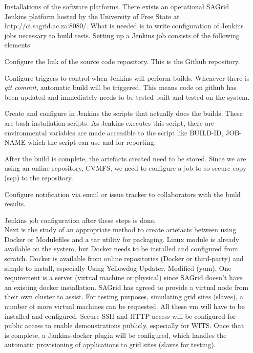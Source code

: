 \documentclass [titlepage,11pt]{article}
\begin{document}
Installations of the software platforms. There exists an operational SAGrid Jenkins platform hosted by the University of Free State at http://ci.sagrid.ac.za:8080/. What is needed is to write configuration of Jenkins jobs necessary to build tests. Setting up a Jenkins job  consists of the following elements \begin{enumerate*}[label=\itshape\alph*\upshape)]
\item Configure the link of the source code repository. This is the Github repository. 
\item Configure triggers to control when Jenkins will perform builds. Whenever there is \emph{git commit}, automatic build will be triggered. This means code on github has been updated and immediately needs to be tested built and tested on the system. 
\item Create and configure in Jenkins the scripts that actually does the builds. These are bash installation scripts. As Jenkins executes this script, there are environmental variables are made accessible to the script like BUILD-ID, JOB-NAME which the script can use and for reporting. 
\item After the build is complete, the artefacts created need to be stored. Since we are using an online repository, CVMFS, we need to configure a job to so secure copy (scp) to the repository. 
\item Configure notification via email or issue tracker to collaborators with the build results.
\end{enumerate*} 
Jenkins job configuration after these steps is done. \\

Next is the study of an appropriate method to create artefacts between using Docker or Modulefiles and a tar utility for packaging. Linux module is already available on the system, but Docker needs to be installed and configured from scratch. Docker is available from online repositories (Docker or third-party) and simple to install, especially Using Yellowdog Updater, Modified (yum). One requirement is a server (virtual machine or physical) since SAGrid doesn't have an existing docker installation. SAGrid has agreed to provide a virtual node from their own cluster to assist. For testing purposes, simulating grid sites (slaves), a number of more virtual machines can be requested. All these vm will have to be installed and configured. Secure SSH and HTTP access will be configured for public access to enable demonstrations publicly, especially for WITS. Once that is complete, a Jankins-docker plugin will be configured, which handles the automatic provisioning of applications to grid sites (slaves for testing). \\
\end{document}
